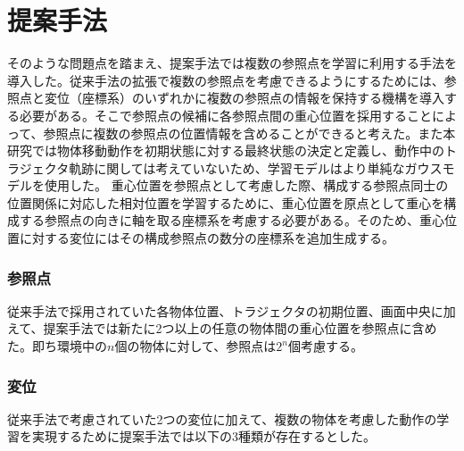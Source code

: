 ﻿%



\chapter{提案手法}

そのような問題点を踏まえ、提案手法では複数の参照点を学習に利用する手法を導入した。従来手法の拡張で複数の参照点を考慮できるようにするためには、参照点と変位（座標系）のいずれかに複数の参照点の情報を保持する機構を導入する必要がある。そこで参照点の候補に各参照点間の重心位置を採用することによって、参照点に複数の参照点の位置情報を含めることができると考えた。また本研究では物体移動動作を初期状態に対する最終状態の決定と定義し、動作中のトラジェクタ軌跡に関しては考えていないため、学習モデルはより単純なガウスモデルを使用した。
重心位置を参照点として考慮した際、構成する参照点同士の位置関係に対応した相対位置を学習するために、重心位置を原点として重心を構成する参照点の向きに軸を取る座標系を考慮する必要がある。そのため、重心位置に対する変位にはその構成参照点の数分の座標系を追加生成する。

\subsection{参照点}

従来手法で採用されていた各物体位置、トラジェクタの初期位置、画面中央に加えて、提案手法では新たに2つ以上の任意の物体間の重心位置を参照点に含めた。即ち環境中の$n$個の物体に対して、参照点は$2^{n}$個考慮する。

\subsection{変位}

従来手法で考慮されていた2つの変位に加えて、複数の物体を考慮した動作の学習を実現するために提案手法では以下の3種類が存在するとした。

